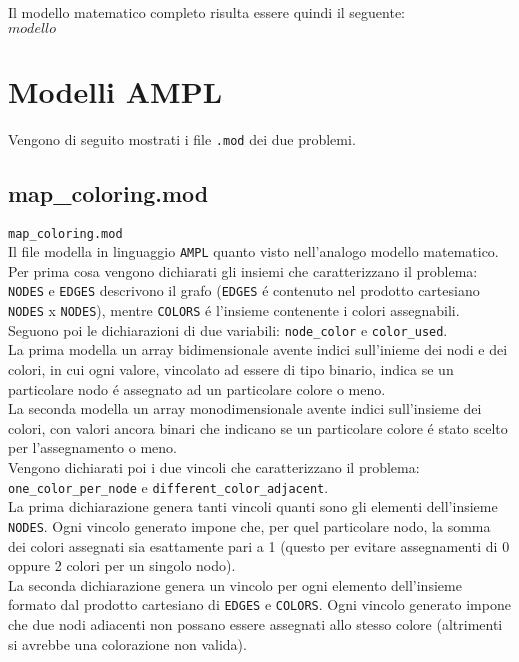 \documentclass{article}
\begin{document}
Il modello matematico completo risulta essere quindi il seguente:\\
$modello$
\pagebreak

\section{Modelli AMPL}
Vengono di seguito mostrati i file \texttt{.mod} dei due problemi.\\

\subsection{map\_coloring.mod}
\texttt{map\_coloring.mod}
\\

Il file modella in linguaggio \texttt{AMPL} quanto visto nell'analogo modello matematico.\\
Per prima cosa vengono dichiarati gli insiemi che caratterizzano il problema: \texttt{NODES} e \texttt{EDGES} descrivono il grafo (\texttt{EDGES} \'e contenuto nel prodotto cartesiano \texttt{NODES} x \texttt{NODES}), mentre \texttt{COLORS} \'e l'insieme contenente i colori assegnabili.\\

Seguono poi le dichiarazioni di due variabili: \texttt{node\_color} e \texttt{color\_used}.\\
La prima modella un array bidimensionale avente indici sull'inieme dei nodi e dei colori, in cui ogni valore, vincolato ad essere di tipo binario, indica se un particolare nodo \'e assegnato ad un particolare colore o meno.\\
La seconda modella un array monodimensionale avente indici sull'insieme dei colori, con valori ancora binari che indicano se un particolare colore \'e stato scelto per l'assegnamento o meno.\\ 

Vengono dichiarati poi i due vincoli che caratterizzano il problema: \texttt{one\_color\_per\_node} e \texttt{different\_color\_adjacent}.\\
La prima dichiarazione genera tanti vincoli quanti sono gli elementi dell'insieme \texttt{NODES}. Ogni vincolo generato impone che, per quel particolare nodo, la somma dei colori assegnati sia esattamente pari a 1 (questo per evitare assegnamenti di 0 oppure 2 colori per un singolo nodo).\\
La seconda dichiarazione genera un vincolo per ogni elemento dell'insieme formato dal prodotto cartesiano di \texttt{EDGES} e \texttt{COLORS}. Ogni vincolo generato impone che due nodi adiacenti non possano essere assegnati allo stesso colore (altrimenti si avrebbe una colorazione non valida).\\
\end{document}
